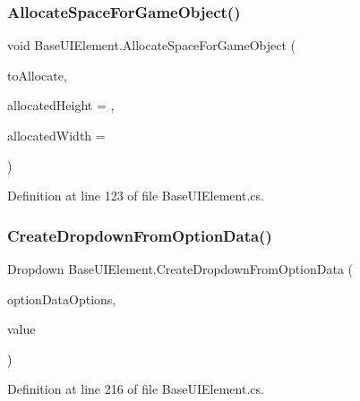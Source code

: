 \subsubsection{\texorpdfstring{Allocate\+Space\+For\+Game\+Object()}{AllocateSpaceForGameObject()}}
{\footnotesize\ttfamily void Base\+U\+I\+Element.\+Allocate\+Space\+For\+Game\+Object (\begin{DoxyParamCaption}\item[{Game\+Object}]{to\+Allocate,  }\item[{int}]{allocated\+Height = {},  }\item[{int}]{allocated\+Width = {} }\end{DoxyParamCaption})\hspace{0.3cm}{\ttfamily [protected]}}



Definition at line 123 of file Base\+U\+I\+Element.\+cs.

\mbox{\label{class_base_u_i_element_ae171e935c4d38482a14abe560a96b556}} 
\subsubsection{\texorpdfstring{Create\+Dropdown\+From\+Option\+Data()}{CreateDropdownFromOptionData()}}
{\footnotesize\ttfamily Dropdown Base\+U\+I\+Element.\+Create\+Dropdown\+From\+Option\+Data (\begin{DoxyParamCaption}\item[{Dropdown.\+Option\+Data \mbox{[}$\,$\mbox{]}}]{option\+Data\+Options,  }\item[{int}]{value }\end{DoxyParamCaption})\hspace{0.3cm}{\ttfamily [protected]}}



Definition at line 216 of file Base\+U\+I\+Element.\+cs.

\mbox{\label{class_base_u_i_element_a639e4a3de2f62f1ab90f96f70f5b2833}} 
